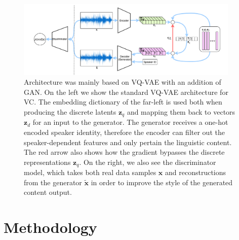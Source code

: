 \documentclass{article}
\begin{document}
\begin{figure}[tb]
\vskip 5mm
\begin{center}
\centerline{\includegraphics[width=0.95\textwidth]{report/figures/model.pdf}}
\caption{Architecture was mainly based on VQ-VAE with an addition of GAN. On the left we show the standard VQ-VAE architecture for VC. The embedding dictionary of the far-left is used both when producing the discrete latents $\mathbf{z}_q$ and mapping them back to vectors $\mathbf{z}_d$ for an input to the generator. The generator receives a one-hot encoded speaker identity, therefore the encoder can filter out the speaker-dependent features and only pertain the linguistic content. The red arrow also shows how the gradient bypasses the discrete representations $\mathbf{z}_q$.
On the right, we also see the discriminator model, which takes both real data samples $\mathbf{x}$ and reconstructions from the generator $\mathbf{\tilde x}$ in order to improve the style of the generated content output.}
\label{fig:model-architecture}
\end{center}
\vskip -5mm
\end{figure} 

\section{Methodology}

\end{document}
